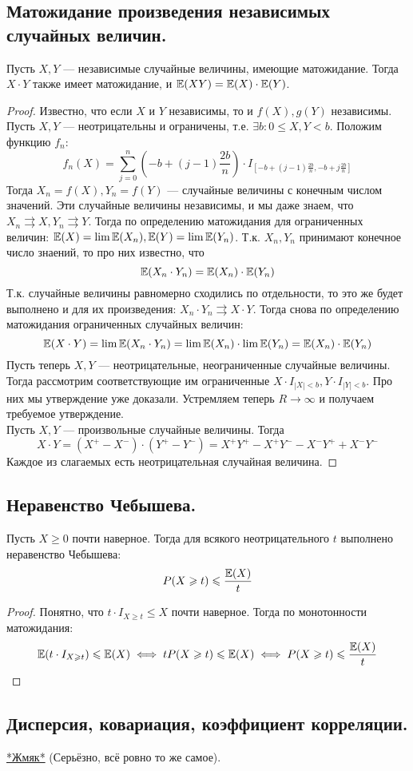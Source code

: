 \subsection{Матожидание произведения независимых случайных величин.}
\begin{proposal}
    Пусть $X, Y$ --- независимые случайные величины, имеющие матожидание. Тогда $X \cdot Y$ также имеет матожидание, и
    $\mathbb{E}(XY) = \mathbb{E}(X) \cdot \mathbb{E}(Y)$.
\end{proposal}
\begin{proof}
    Известно, что если $X$ и $Y$ независимы, то и $f(X), g(Y)$ независимы.
    Пусть $X, Y$ --- неотрицательны и ограничены, т.е. $\exists b \colon 0 \leq X, Y < b$.
    Положим функцию $f_n$:
    \[
        f_n(X) = \sum\limits_{j = 0}^{n} \left(-b + (j - 1)\frac{2b}{n} \right) \cdot I_{\left[-b + (j - 1)\frac{2b}{n}, -b + j\frac{2b}{n} \right]}
    \]
    Тогда $X_n = f(X), Y_n = f(Y)$ --- случайные величины с конечным числом значений. Эти случайные величины независимы,
    и мы даже знаем, что $X_n \rightrightarrows X, Y_n \rightrightarrows Y$. Тогда по определению матожидания для ограниченных
    величин: $\mathbb{E}(X) = \lim \mathbb{E}(X_n), \mathbb{E}(Y) = \lim \mathbb{E}(Y_n)$. Т.к. $X_n, Y_n$ принимают конечное число знаений, то про них
    известно, что
    \[
        \mathbb{E}(X_n \cdot Y_n) = \mathbb{E}(X_n) \cdot \mathbb{E}(Y_n)
    \]
    Т.к. случайные величины равномерно сходились по отдельности, то это же будет выполнено и для их произведения:
    $X_n \cdot Y_n \rightrightarrows X \cdot Y$. Тогда снова по определению матожидания ограниченных случайных величин:
    \[
        \mathbb{E}(X \cdot Y) = \lim \mathbb{E}(X_n \cdot Y_n) = \lim \mathbb{E}(X_n) \cdot \lim \mathbb{E}(Y_n) = \mathbb{E}(X_n) \cdot \mathbb{E}(Y_n)
    \]
    Пусть теперь $X, Y$ --- неотрицательные, неограниченные случайные величины. Тогда рассмотрим соответствующие им ограниченные
    $X \cdot I_{|X| < b}, Y \cdot I_{|Y| < b}$. Про них мы утверждение уже доказали. Устремляем теперь $R \to \infty$
    и получаем требуемое утверждение.\\
    Пусть $X, Y$ --- произвольные случайные величины. Тогда
    \[
        X \cdot Y = (X^+ - X^-) \cdot (Y^+ - Y^-) = X^+Y^+ - X^+Y^- - X^-Y^+ + X^-Y^-
    \]
    Каждое из слагаемых есть неотрицательная случайная величина.
\end{proof}
\subsection{Неравенство Чебышева.}
\begin{proposal}
    Пусть $X \geq 0$ почти наверное. Тогда для всякого неотрицательного $t$ выполнено неравенство Чебышева:
    \[
        P(X \geqslant t) \leqslant \frac{\mathbb{E}(X)}{t}
    \]
\end{proposal}
\begin{proof}
    Понятно, что $t \cdot I_{X \geq t} \leq X$ почти наверное. Тогда по монотонности матожидания:
    \[
        \mathbb{E}(t \cdot I_{X \geqslant t}) \leqslant \mathbb{E}(X)
        \iff
        tP(X \geqslant t) \leqslant \mathbb{E}(X)
        \iff
        P(X \geqslant t) \leqslant \frac{\mathbb{E}(X)}{t}
    \]
\end{proof}
\subsection{Дисперсия, ковариация, коэффициент корреляции.}
\hyperref[Discrete_dispers_etc]{*Жмяк*} (Серьёзно, всё ровно то же самое).